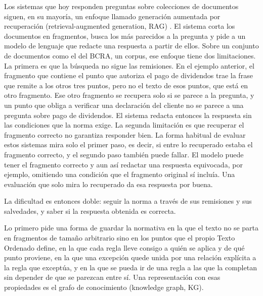 \documentclass[12pt,a4paper]{report}
\begin{document}
Los sistemas que hoy responden preguntas sobre colecciones de documentos siguen, en su mayoría, un enfoque llamado generación aumentada por recuperación (retrieval-augmented generation, RAG) \cite{lewis2020rag}. El sistema corta los documentos en fragmentos, busca los más parecidos a la pregunta y pide a un modelo de lenguaje que redacte una respuesta a partir de ellos. Sobre un conjunto de documentos como el del BCRA, un corpus, ese enfoque tiene dos limitaciones. La primera es que la búsqueda no sigue las remisiones. En el ejemplo anterior, el fragmento que contiene el punto que autoriza el pago de dividendos trae la frase que remite a los otros tres puntos, pero no el texto de esos puntos, que está en otro fragmento. Ese otro fragmento se recupera solo si se parece a la pregunta, y un punto que obliga a verificar una declaración del cliente no se parece a una pregunta sobre pago de dividendos. El sistema redacta entonces la respuesta sin las condiciones que la norma exige. La segunda limitación es que recuperar el fragmento correcto no garantiza responder bien. La forma habitual de evaluar estos sistemas mira solo el primer paso, es decir, si entre lo recuperado estaba el fragmento correcto, y el segundo paso también puede fallar. El modelo puede tener el fragmento correcto y aun así redactar una respuesta equivocada, por ejemplo, omitiendo una condición que el fragmento original sí incluía. Una evaluación que solo mira lo recuperado da esa respuesta por buena.

La dificultad es entonces doble: seguir la norma a través de sus remisiones y sus salvedades, y saber si la respuesta obtenida es correcta.

Lo primero pide una forma de guardar la normativa en la que el texto no se parta en fragmentos de tamaño arbitrario sino en los puntos que el propio Texto Ordenado define, en la que cada regla lleve consigo a quién se aplica y de qué punto proviene, en la que una excepción quede unida por una relación explícita a la regla que exceptúa, y en la que se pueda ir de una regla a las que la completan sin depender de que se parezcan entre sí. Una representación con esas propiedades es el grafo de conocimiento (knowledge graph, KG).
\end{document}

